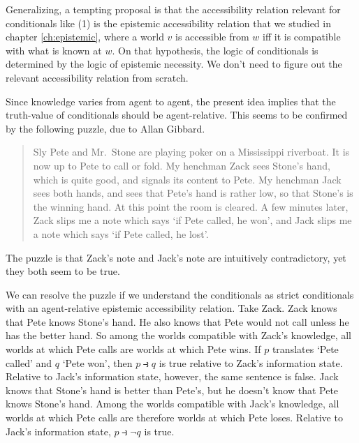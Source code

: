 Generalizing, a tempting proposal is that the accessibility relation relevant
for conditionals like (1) is the epistemic accessibility relation that we
studied in chapter \ref{ch:epistemic}, where a world $v$ is accessible from $w$
iff it is compatible with what is known at $w$. On that hypothesis, the logic of
conditionals is determined by the logic of epistemic necessity. We don't need to
figure out the relevant accessibility relation from scratch.

Since knowledge varies from agent to agent, the present idea implies that the
truth-value of conditionals should be agent-relative. This seems to be confirmed
by the following puzzle, due to Allan Gibbard.
\begin{quote}
  Sly Pete and Mr.\ Stone are playing poker on a Mississippi riverboat. It is
  now up to Pete to call or fold. My henchman Zack sees Stone’s hand, which is
  quite good, and signals its content to Pete. My henchman Jack sees both hands,
  and sees that Pete's hand is rather low, so that Stone's is the winning hand.
  At this point the room is cleared. A few minutes later, Zack slips me a note
  which says `if Pete called, he won', and Jack slips me a note which says `if
  Pete called, he lost'. %
\end{quote}
The puzzle is that Zack's note and Jack's note are intuitively contradictory,
yet they both seem to be true.

We can resolve the puzzle if we understand the conditionals as strict
conditionals with an agent-relative epistemic accessibility relation. Take Zack.
Zack knows that Pete knows Stone's hand. He also knows that Pete would not call
unless he has the better hand. So among the worlds compatible with Zack's
knowledge, all worlds at which Pete calls are worlds at which Pete wins. If $p$
translates `Pete called' and $q$ `Pete won', then $p \strictif q$ is true
relative to Zack's information state. Relative to Jack's information state,
however, the same sentence is false. Jack knows that Stone's hand is better than
Pete's, but he doesn't know that Pete knows Stone's hand. Among the worlds
compatible with Jack's knowledge, all worlds at which Pete calls are therefore
worlds at which Pete loses. Relative to Jack's information state,
$p \strictif \neg q$ is true.

